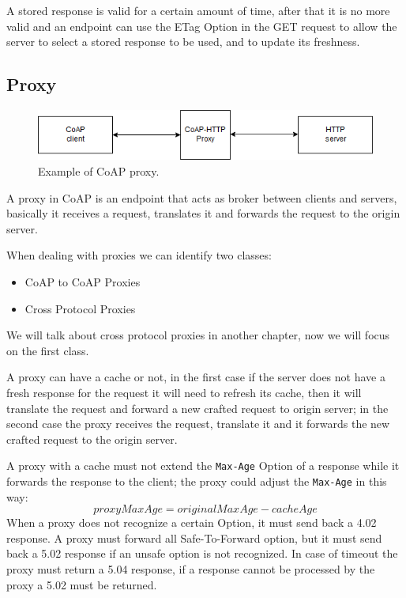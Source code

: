 	A stored response is valid for a certain amount of time, after that it is no more valid and an endpoint can use the ETag Option in the GET request to allow the server to select a stored response to be used, and to update its freshness.
	
	\subsection{Proxy}
	
	\begin{figure}
		\includegraphics[width=\linewidth]{coap-img1.png}
		\caption{Example of CoAP proxy.}
		\label{fig:coap1}
	\end{figure}

	A proxy in CoAP is an endpoint that acts as broker between clients and servers, basically it receives a request, translates it and forwards the request to the origin server.
	
	When dealing with proxies we can identify two classes:
	\begin{itemize}
		\item CoAP to CoAP Proxies
		\item Cross Protocol Proxies
	\end{itemize}
	
	We will talk about cross protocol proxies in another chapter, now we will focus on the first class.
	
	A proxy can have a cache or not, in the first case if the server does not have a fresh response for the request it will need to refresh its cache, then it will translate the request and forward a new crafted request to origin server; in the second case the proxy receives the request, translate it and it forwards the new crafted request to the origin server.
	
	A proxy with a cache must not extend the \texttt{Max-Age} Option of a response while it forwards the response to the client; the proxy could adjust the \texttt{Max-Age} in this way:
	\begin{equation}
		proxyMaxAge=originalMaxAge-cacheAge
	\end{equation}
	When a proxy does not recognize a certain Option, it must send back a 4.02 response.\newline
	A proxy must forward all Safe-To-Forward option, but it must send back a 5.02 response if an unsafe option is not recognized.\newline
	In case of timeout the proxy must return a 5.04 response, if a response cannot be processed by the proxy a 5.02 must be returned.
	
